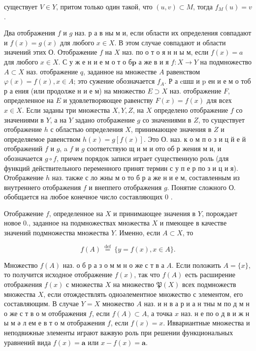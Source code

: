 \documentclass[10pt]{article}
\begin{document}
существует $V \in Y$, притом только один такой, что $(u, v) \subset M$, тогда $f_{M}(u)=v$.



Два отображения $f$ и $g$ наз. р а в ны м и, если области их определения совпадают и $f(x)=g(x)$ для любого $x \in X$. В этом случае совпадают и области значений этих О. Отображение $f$ на $X$ наз. по о т о я н н ы м, если $f(x)=a$ для любого $x \in X$. С у ж е н и е м о т о б$\mathbf{p}$ а же в и я $f: X \rightarrow Y$ на подмножество $A \subset X$ наз. отображение $q$, заданное на множестве $A$ равенством $\varphi(x)=f(x), x \in A$; это сужение обозначается $f_{A}$. Р а cшш и $\mathrm{p}$ ен и е м о тоб р а ения (или продолже н и е м) на множество $E \supset X$ наз. отображение $F$, определенное на $E$ и удовлетворяющее равенству $F(x)=f(x)$ для всех $x \in X$. Если заданы три множества $X, Y, Z$, на $X$ определено отображение $f$ со значениями в $Y$, а на $Y$ задано отображение $g$ со значениями в $Z$, то существует отображение $h$ с областью определения $X$, принимающее значения в $Z$ и определяемое равенством $h(x)=g[f(x)]$. Это О. наз. к о м п о з и ц й $е$ й отображений $f$ и $g$, a $f$ и $g$ соответствую щ и м и ото об р жения м и, и обозначается $g \circ f$, причем порядок записи играет существенную роль (для функций действительного переменного принят термин с у п е р по з и ц и я). Отображение $h$ наз. также с ло жны м о то б р а же н и е м, составленным из внутреннего отображения $f$ и внеппего отображения $g$. Понятие сложного О. обобщается на любое конечное число составляющих 0 .



Отображение $f$, определенное на $X$ и принимающее значения в $Y$, порождает новое $0 .$, заданное на подмножествах множества $X$ и пмеющее в качестве значений подмножества множества $Y$. Именно, если $A \subset X$, то



\[

f(A) \stackrel{\text { def }}{=}\{y=f(x), x \in A\} .

\]



Множество $f(A)$ наз. о б р а з о м м н о же с т в а $A$. Если положить $A=\{x\}$, то получится исходное отображение $f(x)$, так что $f(A)$ есть расширение отображения $f(x)$ с множества $X$ на множество $\mathfrak{P}(X)$ всех подмножеств множества $X$, если отождествлять одноәлементное множество с элементом, его составляющим. В случае $Y=X$ множество $A$ наз. и н в а р и а н тны м по д м н о же с т в о м отображения $f$, если $f(A) \subset A$, а точка $x$ наз. н е по о д в и ж н ы м ә л ем е в т о м отображения $f$, если $f(x)=x$. Иввариантные множества и неподвижные элементы играют важвую роль при решении функциональных уравнений вида $f(x)=\boldsymbol{a}$ или $x-f(x)=\boldsymbol{a}$.
\end{document}
